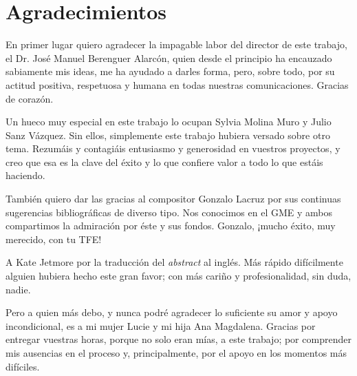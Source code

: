 \chapter[Agradecimientos]{Agradecimientos}


En primer lugar quiero agradecer la impagable labor del director de este trabajo, el Dr. José Manuel Berenguer Alarcón, quien desde el principio ha encauzado sabiamente mis ideas, me ha ayudado a darles forma, pero, sobre todo, por su actitud positiva, respetuosa y humana en todas nuestras comunicaciones. Gracias de corazón. 

Un hueco muy especial en este trabajo lo ocupan Sylvia Molina Muro y Julio Sanz Vázquez. Sin ellos, simplemente este trabajo hubiera versado sobre otro tema. Rezumáis y contagiáis entusiasmo y generosidad en vuestros proyectos, y creo que esa es la clave del éxito y lo que confiere valor a todo lo que estáis haciendo.

También quiero dar las gracias al compositor Gonzalo Lacruz por sus continuas sugerencias bibliográficas de diverso tipo. Nos conocimos en el GME y ambos compartimos la admiración por éste y sus fondos. Gonzalo, ¡mucho éxito, muy merecido, con tu TFE!

A Kate Jetmore por la traducción del \textit{abstract} al inglés. Más rápido difícilmente alguien hubiera hecho este gran favor; con más cariño y profesionalidad, sin duda, nadie.

Pero a quien más debo, y nunca podré agradecer lo suficiente su amor y apoyo incondicional, es a mi mujer Lucie y mi hija Ana Magdalena. Gracias por entregar vuestras horas, porque no solo eran mías, a este trabajo; por comprender mis ausencias en el proceso y, principalmente, por el apoyo en los momentos más difíciles. 



